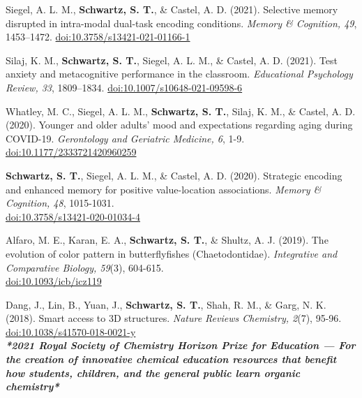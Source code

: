 \pubspace

Siegel, A. L. M., \textbf{Schwartz, S. T.}, \& Castel, A. D. (2021). Selective memory disrupted in intra-modal dual-task encoding conditions. \textit{Memory \& Cognition, 49}, 1453–1472. \textcolor{RoyalBlue}{\href{https://doi.org/10.3758/s13421-021-01166-1}{doi:10.3758/s13421-021-01166-1}}

\pubspace

Silaj, K. M., \textbf{Schwartz, S. T.}, Siegel, A. L. M., \& Castel, A. D. (2021). Test anxiety and metacognitive performance in the classroom. \textit{Educational Psychology Review, 33}, 1809–1834. \textcolor{RoyalBlue}{\href{https://doi.org/10.1007/s10648-021-09598-6}{doi:10.1007/s10648-021-09598-6}}

\pubspace

Whatley, M. C., Siegel, A. L. M., \textbf{Schwartz, S. T.}, Silaj, K. M., \& Castel, A. D. (2020). Younger and older adults' mood and expectations regarding aging during COVID-19. \textit{Gerontology and Geriatric Medicine, 6}, 1-9. \textcolor{RoyalBlue}{\href{https://doi.org/10.1177/2333721420960259}{doi:10.1177/2333721420960259}}

\pubspace

\textbf{Schwartz, S. T.}, Siegel, A. L. M., \& Castel, A. D. (2020). Strategic encoding and enhanced memory for positive value-location associations. \textit{Memory \& Cognition, 48}, 1015-1031. \\ \textcolor{RoyalBlue}{\href{https://doi.org/10.3758/s13421-020-01034-4}{doi:10.3758/s13421-020-01034-4}}

\pubspace

Alfaro, M. E., Karan, E. A., \textbf{Schwartz, S. T.}, \& Shultz, A. J. (2019). The evolution of color pattern in butterflyfishes (Chaetodontidae). \textit{Integrative and Comparative Biology, 59}(3), 604-615.\\ \textcolor{RoyalBlue}{\href{https://doi.org/10.1093/icb/icz119}{doi:10.1093/icb/icz119}}

\pubspace

Dang, J., Lin, B., Yuan, J., \textbf{Schwartz, S. T.}, Shah, R. M., \& Garg, N. K. (2018). Smart access to 3D structures. \textit{Nature Reviews Chemistry, 2}(7), 95-96. \textcolor{RoyalBlue}{\href{https://doi.org/10.1038/s41570-018-0021-y}{doi:10.1038/s41570-018-0021-y}}\\ \textbf{\textit{*2021 Royal Society of Chemistry Horizon Prize for Education --- For the creation of innovative chemical education resources that benefit how students, children, and the general public learn organic chemistry*}}


